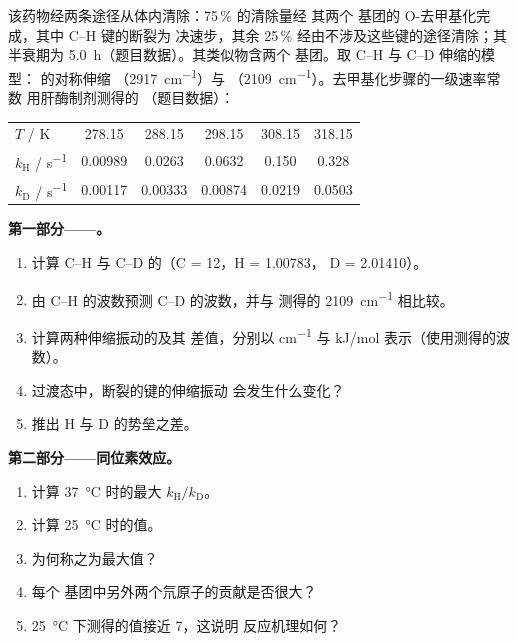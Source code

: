 \begin{problem}
\label{pb:b3:rate-theories:1}
该药物经两条途径从体内清除：75\,\% 的清除量经
其两个  基团的 O-去甲基化完成，其中 C--H 键的断裂为
决速步，其余 25\,\% 经由不涉及这些键的途径清除；其
半衰期为 \qty{5.0}{h}（题目数据）。其类似物含两个 
基团。取 C--H 与 C--D 伸缩的模型： 的对称伸缩
（\qty{2917}{cm^{-1}}）与 （\qty{2109}{cm^{-1}}）。去甲基化步骤的一级速率常数
用肝酶制剂测得的
（题目数据）：
\begin{center}\small
\begin{tabular}{lccccc}
\hline
$T$ / K & 278.15 & 288.15 & 298.15 & 308.15 & 318.15 \\
$k_{\mathrm H}$ / \unit{s^{-1}} & 0.00989 & 0.0263 & 0.0632 & 0.150 & 0.328 \\
$k_{\mathrm D}$ / \unit{s^{-1}} & 0.00117 & 0.00333 & 0.00874 & 0.0219 & 0.0503 \\ \hline
\end{tabular}
\end{center}

\medskip\noindent\textbf{第一部分——。}
\begin{enumerate}
  \item 计算 C--H 与 C--D 的（C = 12，H = 1.00783，
        D = 2.01410）。
  \item 由 C--H 的波数预测 C--D 的波数，并与
        测得的 \qty{2109}{cm^{-1}} 相比较。
  \item 计算两种伸缩振动的及其
        差值，分别以 \unit{cm^{-1}} 与 \unit{kJ/mol} 表示（使用测得的波数）。
  \item 过渡态中，断裂的键的伸缩振动
        会发生什么变化？
  \item 推出 H 与 D 的势垒之差。
\end{enumerate}

\medskip\noindent\textbf{第二部分——同位素效应。}
\begin{enumerate}[resume]
  \item 计算 \qty{37}{\celsius} 时的最大 $k_{\mathrm H}/k_{\mathrm D}$。
  \item 计算 \qty{25}{\celsius} 时的值。
  \item 为何称之为最大值？
  \item 每个  基团中另外两个氘原子的贡献是否很大？
  \item \qty{25}{\celsius} 下测得的值接近 7，这说明
        反应机理如何？
\end{enumerate}


\end{problem}
